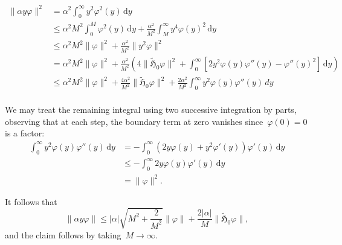 \documentclass[10pt]{article}
\renewcommand{\d}{\mathrm{d}}
\newcommand{\1}{\mathbbm 1}
\begin{document}
    \begin{equation}
        \begin{aligned}
            \|\alpha y\varphi\|^2 &= \alpha^2\int_0^\infty y^2\varphi^2(y)\,\d y\\
            &\leq \alpha^2 M^2\int_0^M \varphi^2(y)\,\d y + \frac{\alpha^2}{M^2}\int_M^\infty y^4\varphi(y)^2\,\d y\\
            &\leq \alpha^2 M^2\|\varphi\|^2 + \frac{\alpha^2}{M^2}\|y^2\varphi\|^2\\
             &= \alpha^2M^2\|\varphi\|^2 + \frac{\alpha^2}{M^2}\left(4\|\widetilde{\mathfrak H}_0\varphi\|^2 +\int_0^\infty \left[2y^2 \varphi(y)\varphi''(y)-\varphi''(y)^2\right]\,\d y\right)\\
             &\leq \alpha^2 M^2\|\varphi\|^2 + \frac{4\alpha^2}{M^2}\|\widetilde{\mathfrak H}_0 \varphi\|^2 + \frac{2\alpha^2}{M^2}\int_0^\infty y^2 \varphi(y)\varphi''(y)\, d y\\
        \end{aligned}
    \end{equation}

    We may treat the remaining integral using two successive integration by parts, observing that at each step, the boundary term at zero vanishes since~$\varphi(0)=0$ is a factor:
    \begin{equation}
        \begin{aligned}
            \int_0^\infty y^2\varphi(y)\varphi''(y)\,\d y &= -\int_0^\infty (2y\varphi(y) + y^2 \varphi'(y))\varphi'(y)\,\d y\\
            & \leq -\int_0^\infty 2y\varphi(y)\varphi'(y)\, \d y\\
            &= \|\varphi\|^2.
        \end{aligned}
    \end{equation}

    It follows that
    \begin{equation}
        \label{eq:relative_bound}
        \|\alpha y \varphi\| \leq |\alpha|\sqrt{M^2+\frac{2}{M^2}}\|\varphi\| + \frac{2|\alpha|}M \| \widetilde{\mathfrak H}_0 \varphi\|,
    \end{equation}
    and the claim follows by taking~$M\to \infty$.
\end{document}
